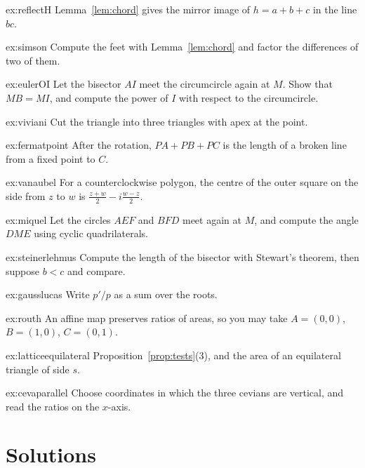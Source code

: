 \begin{hint}{ex:reflectH}
Lemma~\ref{lem:chord} gives the mirror image of $h=a+b+c$ in the line $bc$.
\end{hint}
\begin{hint}{ex:simson}
Compute the feet with Lemma~\ref{lem:chord} and factor the differences of two of them.
\end{hint}
\begin{hint}{ex:eulerOI}
Let the bisector $AI$ meet the circumcircle again at $M$. Show that $MB=MI$, and compute the power of $I$ with respect to the circumcircle.
\end{hint}
\begin{hint}{ex:viviani}
Cut the triangle into three triangles with apex at the point.
\end{hint}
\begin{hint}{ex:fermatpoint}
After the rotation, $PA+PB+PC$ is the length of a broken line from a fixed point to $C$.
\end{hint}
\begin{hint}{ex:vanaubel}
For a counterclockwise polygon, the centre of the outer square on the side from $z$ to $w$ is $\frac{z+w}2-i\frac{w-z}2$.
\end{hint}
\begin{hint}{ex:miquel}
Let the circles $AEF$ and $BFD$ meet again at $M$, and compute the angle $DME$ using cyclic quadrilaterals.
\end{hint}
\begin{hint}{ex:steinerlehmus}
Compute the length of the bisector with Stewart's theorem, then suppose $b<c$ and compare.
\end{hint}
\begin{hint}{ex:gausslucas}
Write $p'/p$ as a sum over the roots.
\end{hint}
\begin{hint}{ex:routh}
An affine map preserves ratios of areas, so you may take $A=(0,0)$, $B=(1,0)$, $C=(0,1)$.
\end{hint}
\begin{hint}{ex:latticeequilateral}
Proposition~\ref{prop:tests}(3), and the area of an equilateral triangle of side $s$.
\end{hint}
\begin{hint}{ex:cevaparallel}
Choose coordinates in which the three cevians are vertical, and read the ratios on the $x$-axis.
\end{hint}

\section{Solutions}

